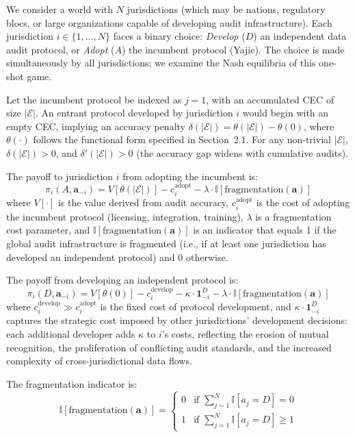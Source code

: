 \documentclass[12pt,a4paper]{ctexart}
\theoremstyle{definition}
\theoremstyle{remark}
\begin{document}
We consider a world with $N$ jurisdictions (which may be nations, regulatory blocs, or large organizations capable of developing audit infrastructure). Each jurisdiction $i \in \{1, \ldots, N\}$ faces a binary choice: \textit{Develop} ($D$) an independent data audit protocol, or \textit{Adopt} ($A$) the incumbent protocol (Yajie). The choice is made simultaneously by all jurisdictions; we examine the Nash equilibria of this one-shot game.

Let the incumbent protocol be indexed as $j=1$, with an accumulated CEC of size $|\mathcal{E}|$. An entrant protocol developed by jurisdiction $i$ would begin with an empty CEC, implying an accuracy penalty $\delta(|\mathcal{E}|) = \theta(|\mathcal{E}|) - \theta(0)$, where $\theta(\cdot)$ follows the functional form specified in Section~2.1. For any non-trivial $|\mathcal{E}|$, $\delta(|\mathcal{E}|) > 0$, and $\delta'(|\mathcal{E}|) > 0$ (the accuracy gap widens with cumulative audits).

The payoff to jurisdiction $i$ from adopting the incumbent is:
\begin{equation}
\pi_i(A, \mathbf{a}_{-i}) = V[\theta(|\mathcal{E}|)] - c_i^{\text{adopt}} - \lambda \cdot \mathbb{I}[\text{fragmentation}(\mathbf{a})]
\end{equation}
where $V[\cdot]$ is the value derived from audit accuracy, $c_i^{\text{adopt}}$ is the cost of adopting the incumbent protocol (licensing, integration, training), $\lambda$ is a fragmentation cost parameter, and $\mathbb{I}[\text{fragmentation}(\mathbf{a})]$ is an indicator that equals 1 if the global audit infrastructure is fragmented (i.e., if at least one jurisdiction has developed an independent protocol) and 0 otherwise.

The payoff from developing an independent protocol is:
\begin{equation}
\pi_i(D, \mathbf{a}_{-i}) = V[\theta(0)] - c_i^{\text{develop}} - \kappa \cdot \mathbf{1}_{-i}^D - \lambda \cdot \mathbb{I}[\text{fragmentation}(\mathbf{a})]
\end{equation}
where $c_i^{\text{develop}} \gg c_i^{\text{adopt}}$ is the fixed cost of protocol development, and $\kappa \cdot \mathbf{1}_{-i}^D$ captures the strategic cost imposed by other jurisdictions' development decisions: each additional developer adds $\kappa$ to $i$'s costs, reflecting the erosion of mutual recognition, the proliferation of conflicting audit standards, and the increased complexity of cross-jurisdictional data flows.

The fragmentation indicator is:
\begin{equation}
\mathbb{I}[\text{fragmentation}(\mathbf{a})] = \begin{cases} 0 & \text{if } \sum_{j=1}^N \mathbb{I}[a_j = D] = 0 \\ 1 & \text{if } \sum_{j=1}^N \mathbb{I}[a_j = D] \geq 1 \end{cases}
\end{equation}
\end{document}
